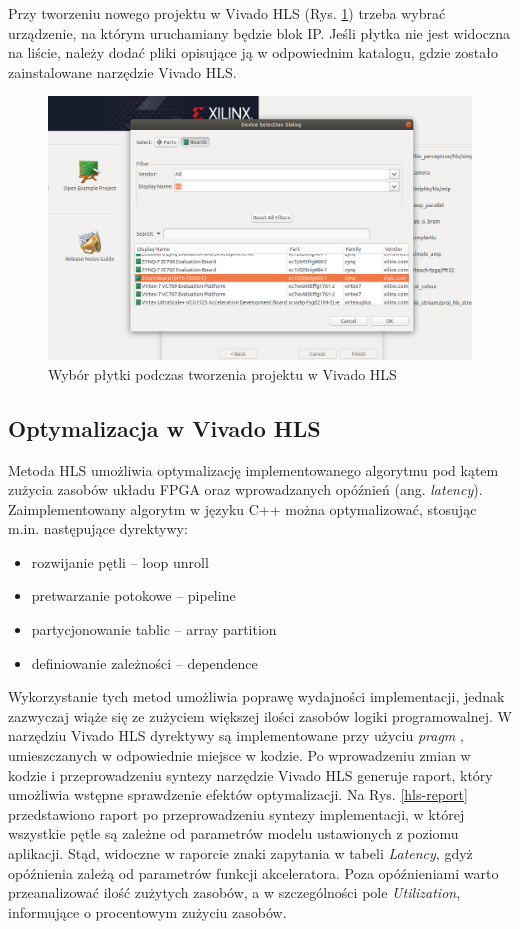 Przy tworzeniu nowego projektu w Vivado HLS (Rys. \ref{hls_new_project}) trzeba wybrać 
urządzenie, na którym uruchamiany będzie blok IP. Jeśli płytka nie jest widoczna na 
liście, należy dodać pliki opisujące ją w odpowiednim katalogu, gdzie zostało 
zainstalowane narzędzie Vivado HLS.  

\begin{figure}[!h]
  \centering
  \includegraphics[width=\textwidth]{img/vivado-hls-new.png}
  \caption{Wybór płytki podczas tworzenia projektu w Vivado HLS}
  \label{hls_new_project}
\end{figure}

\subsection{Optymalizacja w Vivado HLS}

Metoda HLS umożliwia optymalizację implementowanego algorytmu pod kątem zużycia zasobów układu FPGA oraz wprowadzanych opóźnień (ang. \emph{latency}). Zaimplementowany algorytm w języku C++ można optymalizować, stosując m.in. następujące dyrektywy:
\begin{itemize}
  \item rozwijanie pętli -- loop unroll
  \item pretwarzanie potokowe -- pipeline
  \item partycjonowanie tablic -- array partition
  \item definiowanie zależności -- dependence
\end{itemize} 
Wykorzystanie tych metod umożliwia poprawę wydajności implementacji, jednak zazwyczaj wiąże się ze zużyciem większej ilości zasobów logiki programowalnej. W narzędziu Vivado HLS dyrektywy są implementowane przy użyciu \emph{pragm} \cite{hls-pragmas}, umieszczanych w odpowiednie miejsce w kodzie. Po wprowadzeniu zmian w kodzie i przeprowadzeniu syntezy narzędzie Vivado HLS generuje raport, który umożliwia wstępne sprawdzenie efektów optymalizacji. Na Rys. \ref{hls-report} przedstawiono raport po przeprowadzeniu syntezy implementacji, w której wszystkie pętle są zależne od parametrów modelu ustawionych z poziomu aplikacji. Stąd, widoczne w raporcie znaki zapytania w tabeli \emph{Latency}, gdyż opóźnienia zależą od parametrów funkcji akceleratora. Poza opóźnieniami warto przeanalizować ilość zużytych zasobów, a w szczególności pole \emph{Utilization}, informujące o procentowym zużyciu zasobów. 

